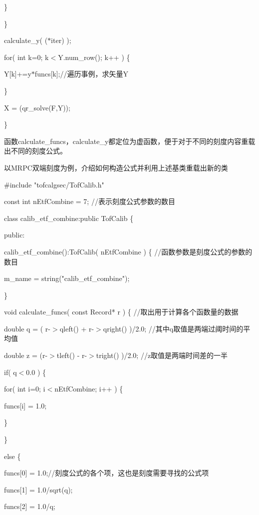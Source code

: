 \quad\quad\quad\quad        \}

\quad\quad\quad      \}

\quad\quad\quad      calculate\_y( ($*$iter) );

\quad\quad\quad      for( int k=0; k$<$Y.num\_row(); k++ ) \{

\quad\quad\quad\quad        Y[k]+=y$*$funcs[k];//遍历事例，求矢量Y

\quad\quad\quad      \}

\quad\quad\quad   X = (qr\_solve(F,Y));

\}

函数calculate\_funcs，calculate\_y都定位为虚函数，便于对于不同的刻度内容重载出不同的刻度公式。

以MRPC双端刻度为例，介绍如何构造公式并利用上述基类重载出新的类

\#include "tofcalgsec/TofCalib.h"

const int nEtfCombine = 7;   //表示刻度公式参数的数目

class calib\_etf\_combine:public TofCalib \{

 public:

\quad  calib\_etf\_combine():TofCalib( nEtfCombine ) \{  //函数参数是刻度公式的参数的数目

\quad\quad    m\_name = string("calib\_etf\_combine");

\quad  \}

\quad  void calculate\_funcs( const Record* r ) \{                  //取出用于计算各个函数量的数据

\quad\quad    double q = ( r-$>$qleft() + r-$>$qright() )/2.0;      //其中q取值是两端过阈时间的平均值

\quad\quad    double z = (r-$>$tleft() - r-$>$tright() )/2.0;       //z取值是两端时间差的一半

\quad\quad    if( q$<$0.0 ) \{

\quad\quad\quad     for( int i=0; i$<$nEtfCombine; i++ ) \{

\quad\quad\quad\quad        funcs[i] = 1.0;

\quad\quad\quad      \}

\quad\quad    \}

\quad\quad    else \{

\quad\quad\quad      funcs[0] = 1.0;//刻度公式的各个项，这也是刻度需要寻找的公式项

\quad\quad\quad      funcs[1] = 1.0/sqrt(q);

\quad\quad\quad      funcs[2] = 1.0/q;

